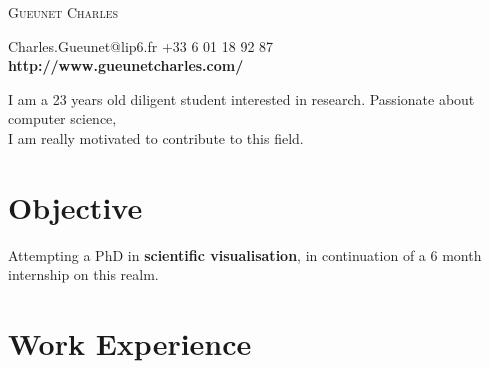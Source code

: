 \documentclass[a4paper, oneside, final]{scrartcl} %
\begin{document}
\begin{center} %


{\fontsize{36}{36}\selectfont\scshape 
Gueunet Charles} %

{\Large\Letter} Charles.Gueunet@lip6.fr \hspace{0.2cm} {\Large\Telefon} +33 6 01 18 92 87 \\
\textbf{http://www.gueunetcharles.com/} 


\vspace{0.2cm} %


\begin{flushleft}
  I am a 23 years old diligent student interested in research. Passionate about computer science,\\
  I am really motivated to contribute to this field.
\end{flushleft}


\section{Objective}

Attempting a PhD in \textbf{scientific visualisation}, in continuation of a 6 month internship on this realm.


\section{Work Experience}


\end{center}
\end{document}

